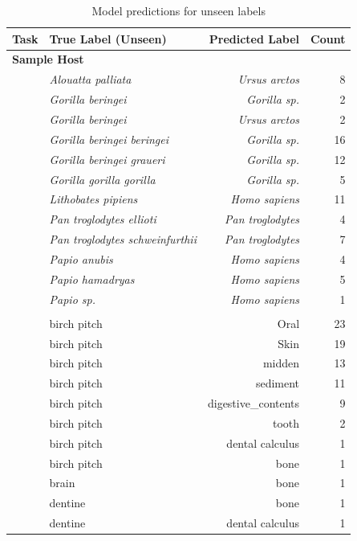 \begin{table}[!t]
\caption{Model predictions for unseen labels\label{tab:unseen_labels}}
\begin{tabular*}{\columnwidth}{@{\extracolsep{\fill}}llrr@{\extracolsep{\fill}}}
\toprule
Task & True Label (Unseen) & Predicted Label & Count \\
\midrule
\multicolumn{4}{l}{\textbf{Sample Host}} \\
\addlinespace[0.5em]
 & \textit{Alouatta palliata} & \textit{Ursus arctos} & 8 \\
 & \textit{Gorilla beringei} & \textit{Gorilla sp.} & 2 \\
 & \textit{Gorilla beringei} & \textit{Ursus arctos} & 2 \\
 & \textit{Gorilla beringei beringei} & \textit{Gorilla sp.} & 16 \\
 & \textit{Gorilla beringei graueri} & \textit{Gorilla sp.} & 12 \\
 & \textit{Gorilla gorilla gorilla} & \textit{Gorilla sp.} & 5 \\
 & \textit{Lithobates pipiens} & \textit{Homo sapiens} & 11 \\
 & \textit{Pan troglodytes ellioti} & \textit{Pan troglodytes} & 4 \\
 & \textit{Pan troglodytes schweinfurthii} & \textit{Pan troglodytes} & 7 \\
 & \textit{Papio anubis} & \textit{Homo sapiens} & 4 \\
 & \textit{Papio hamadryas} & \textit{Homo sapiens} & 5 \\
 & \textit{Papio sp.} & \textit{Homo sapiens} & 1 \\
\addlinespace
\multicolumn{4}{l}{\textbf{Material}} \\
\addlinespace[0.5em]
 & birch pitch & Oral & 23 \\
 & birch pitch & Skin & 19 \\
 & birch pitch & midden & 13 \\
 & birch pitch & sediment & 11 \\
 & birch pitch & digestive\_contents & 9 \\
 & birch pitch & tooth & 2 \\
 & birch pitch & dental calculus & 1 \\
 & birch pitch & bone & 1 \\
 & brain & bone & 1 \\
 & dentine & bone & 1 \\
 & dentine & dental calculus & 1 \\

\end{tabular*}
\end{table}
